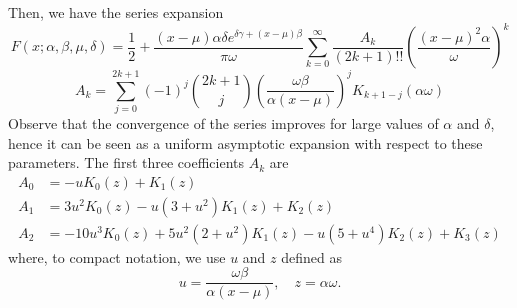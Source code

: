 \documentclass[10pt,a4paper,oneside]{article}
\numberwithin{equation}{section}
\begin{document}
Then, we have the series expansion
\begin{equation}\label{general_expansion_xmu_small_bessel}
F(x;\alpha, \beta, \mu, \delta) = \frac{1}{2} + \frac{(x-\mu)\alpha\delta e^{\delta \gamma + (x -\mu)\beta}}{\pi \omega}\sum_{k=0}^{\infty} \frac{A_k}{(2k+1)!!}\left(\frac{(x-\mu)^2\alpha}{\omega}\right)^k
\end{equation}
\begin{equation}
A_k = \sum_{j=0}^{2k+1} (-1)^j \binom{2k+1}{j} \left(\frac{\omega \beta}{\alpha (x-\mu)}\right)^j K_{k + 1 - j}(\alpha \omega)
\end{equation}
Observe that the convergence of the series improves for large values of $\alpha$ and $\delta$, hence it can be seen as a uniform asymptotic expansion with respect to these parameters. The first three coefficients $A_k$ are
\begin{align*}
A_0 &= -u K_0(z) + K_1(z)\\
A_1 &= 3u^2 K_0(z) - u(3 + u^2) K_1(z) + K_2(z)\\
A_2 &= -10u^3 K_0(z) + 5u^2(2 + u^2) K_1(z) - u(5 + u^4) K_2(z) + K_3(z)
\end{align*}
where, to compact notation, we use $u$ and $z$ defined as
\begin{equation}
u = \frac{\omega \beta}{\alpha (x-\mu)}, \quad z = \alpha \omega.
\end{equation}
\end{document}
